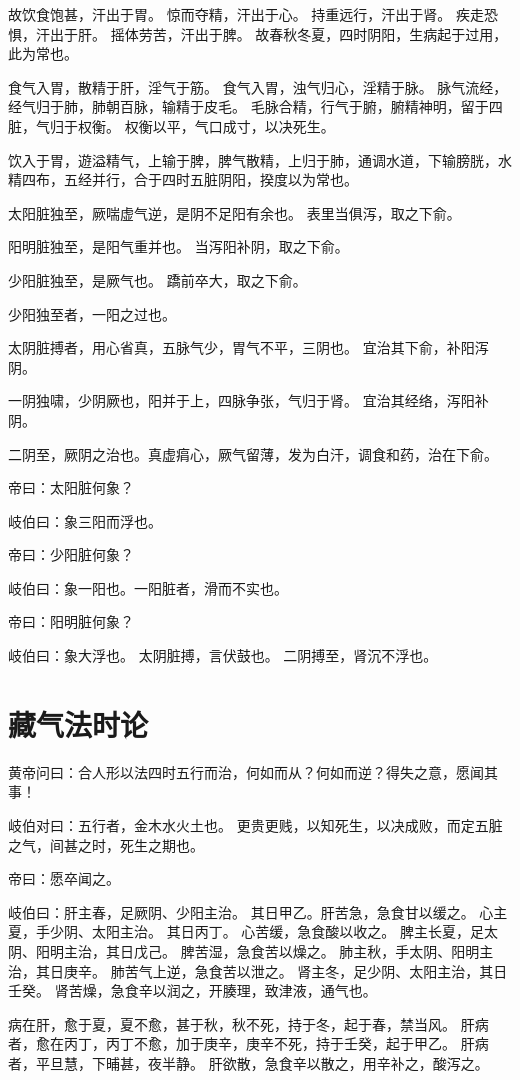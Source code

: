 \documentclass{article}%
\begin{document}
故饮食饱甚，汗出于胃。
惊而夺精，汗出于心。
持重远行，汗出于肾。
疾走恐惧，汗出于肝。
摇体劳苦，汗出于脾。
故春秋冬夏，四时阴阳，生病起于过用，此为常也。

食气入胃，散精于肝，淫气于筋。
食气入胃，浊气归心，淫精于脉。
脉气流经，经气归于肺，肺朝百脉，输精于皮毛。
毛脉合精，行气于腑，腑精神明，留于四脏，气归于权衡。
权衡以平，气口成寸，以决死生。

饮入于胃，遊溢精气，上输于脾，脾气散精，上归于肺，通调水道，下输膀胱，水精四布，五经并行，合于四时五脏阴阳，揆度以为常也。

太阳脏独至，厥喘虚气逆，是阴不足阳有余也。
表里当俱泻，取之下俞。

阳明脏独至，是阳气重并也。
当泻阳补阴，取之下俞。

少阳脏独至，是厥气也。
蹻前卒大，取之下俞。

少阳独至者，一阳之过也。

太阴脏搏者，用心省真，五脉气少，胃气不平，三阴也。
宜治其下俞，补阳泻阴。

一阴独啸，少阴厥也，阳并于上，四脉争张，气归于肾。
宜治其经络，泻阳补阴。

二阴至，厥阴之治也。真虚㾓心，厥气留薄，发为白汗，调食和药，治在下俞。

帝曰：太阳脏何象？

岐伯曰：象三阳而浮也。

帝曰：少阳脏何象？

岐伯曰：象一阳也。一阳脏者，滑而不实也。

帝曰：阳明脏何象？

岐伯曰：象大浮也。
太阴脏搏，言伏鼓也。
二阴搏至，肾沉不浮也。


\section{藏气法时论}
黄帝问曰：合人形以法四时五行而治，何如而从？何如而逆？得失之意，愿闻其事！

岐伯对曰：五行者，金木水火土也。
更贵更贱，以知死生，以决成败，而定五脏之气，间甚之时，死生之期也。

帝曰：愿卒闻之。

岐伯曰：肝主春，足厥阴、少阳主治。
其日甲乙。肝苦急，急食甘以缓之。
心主夏，手少阴、太阳主治。
其日丙丁。
心苦缓，急食酸以收之。
脾主长夏，足太阴、阳明主治，其日戊己。
脾苦湿，急食苦以燥之。
肺主秋，手太阴、阳明主治，其日庚辛。
肺苦气上逆，急食苦以泄之。
肾主冬，足少阴、太阳主治，其日壬癸。
肾苦燥，急食辛以润之，开腠理，致津液，通气也。

病在肝，愈于夏，夏不愈，甚于秋，秋不死，持于冬，起于春，禁当风。
肝病者，愈在丙丁，丙丁不愈，加于庚辛，庚辛不死，持于壬癸，起于甲乙。
肝病者，平旦慧，下晡甚，夜半静。
肝欲散，急食辛以散之，用辛补之，酸泻之。
\end{document}

